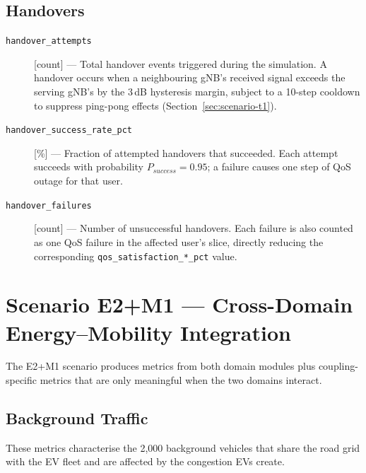 \subsection*{Handovers}

\begin{description}

\item[\texttt{handover\_attempts}] [count] ---
  Total handover events triggered during the simulation.  A handover occurs
  when a neighbouring gNB's received signal exceeds the serving gNB's by the
  3\,dB hysteresis margin, subject to a 10-step cooldown to suppress
  ping-pong effects (Section~\ref{sec:scenario-t1}).

\item[\texttt{handover\_success\_rate\_pct}] [\%] ---
  Fraction of attempted handovers that succeeded.  Each attempt succeeds with
  probability $P_{success} = 0.95$; a failure causes one step of QoS outage
  for that user.

\item[\texttt{handover\_failures}] [count] ---
  Number of unsuccessful handovers.  Each failure is also counted as one QoS
  failure in the affected user's slice, directly reducing the corresponding
  \texttt{qos\_satisfaction\_*\_pct} value.

\end{description}

\section{Scenario E2+M1 --- Cross-Domain Energy--Mobility Integration}
\label{sec:metrics-e2m1}

The E2+M1 scenario produces metrics from both domain modules plus
coupling-specific metrics that are only meaningful when the two domains
interact.

\subsection*{Background Traffic}

These metrics characterise the 2,000 background vehicles that share the road
grid with the EV fleet and are affected by the congestion EVs create.

